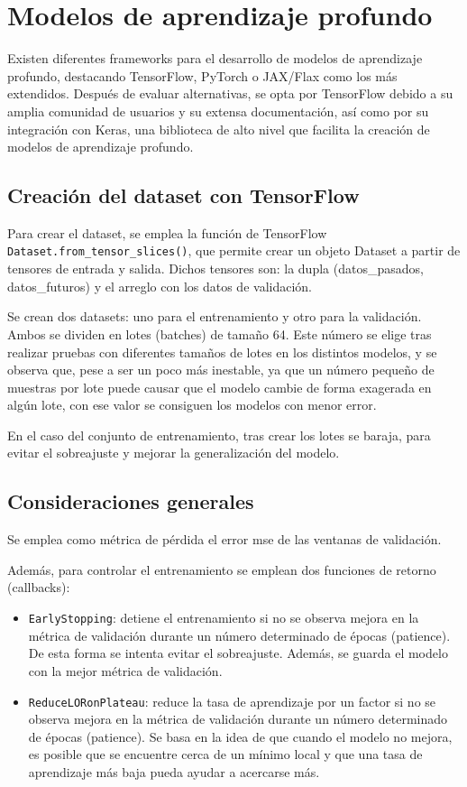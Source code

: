 \section{Modelos de aprendizaje profundo}
Existen diferentes frameworks para el desarrollo de modelos de aprendizaje profundo, destacando TensorFlow, PyTorch o JAX/Flax como los más extendidos.
Después de evaluar alternativas, se opta por TensorFlow debido a su amplia comunidad de usuarios y su extensa documentación, así como por su integración con Keras, 
una biblioteca de alto nivel que facilita la creación de modelos de aprendizaje profundo.

\subsection{Creación del dataset con TensorFlow}
Para crear el dataset, se emplea la función de TensorFlow \texttt{Dataset.from\_tensor\_slices()}, que permite crear un objeto Dataset 
a partir de tensores de entrada y salida. Dichos tensores son: la dupla (datos\_pasados, datos\_futuros) y el arreglo con los datos de validación.

Se crean dos datasets: uno para el entrenamiento y otro para la validación. Ambos se dividen en lotes (batches) de tamaño 64. Este número se elige tras realizar 
pruebas con diferentes tamaños de lotes en los distintos modelos, y se observa que, pese a ser un poco más inestable, ya que un número pequeño de muestras por lote
puede causar que el modelo cambie de forma exagerada en algún lote, con ese valor se consiguen los modelos con menor error. 

En el caso del conjunto de entrenamiento, tras crear los lotes se baraja, para evitar el sobreajuste y mejorar la generalización del modelo.

\subsection{Consideraciones generales}
Se emplea como métrica de pérdida el error mse de las ventanas de validación.

Además, para controlar el entrenamiento se emplean dos funciones de retorno (callbacks): 
\begin{itemize}
\item \texttt{EarlyStopping}: detiene el entrenamiento si no se observa mejora en la métrica de validación durante un número determinado de épocas (patience). 
De esta forma se intenta evitar el sobreajuste. Además, se guarda el modelo con la mejor métrica de validación.
\item \texttt{ReduceLORonPlateau}: reduce la tasa de aprendizaje por un factor si no se observa mejora en la métrica de validación durante un número determinado de épocas (patience).
Se basa en la idea de que cuando el modelo no mejora, es posible que se encuentre cerca de un mínimo local y que una tasa de aprendizaje más baja pueda ayudar a acercarse más.
\end{itemize}

